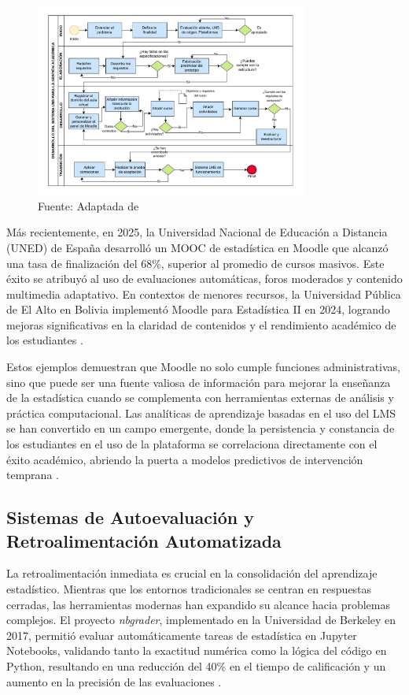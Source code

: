 \documentclass[letter,oneside,12pt,spanish]{report}
\begin{document}
\begin{figure}[ht]
    \centering
    \includegraphics[width=0.8\textwidth]{Figs/LMS.pdf}
    \label{fig:LMS}
    \\Fuente: Adaptada de \textcite{Pacheco2025}
\end{figure}

Más recientemente, en 2025, la Universidad Nacional de Educación a Distancia (UNED) de España desarrolló un MOOC de estadística en Moodle que alcanzó una tasa de finalización del 68\%, superior al promedio de cursos masivos. Este éxito se atribuyó al uso de evaluaciones automáticas, foros moderados y contenido multimedia adaptativo. En contextos de menores recursos, la Universidad Pública de El Alto en Bolivia implementó Moodle para Estadística II en 2024, logrando mejoras significativas en la claridad de contenidos y el rendimiento académico de los estudiantes \parencite{Ndibalema2025}.

Estos ejemplos demuestran que Moodle no solo cumple funciones administrativas, sino que puede ser una fuente valiosa de información para mejorar la enseñanza de la estadística cuando se complementa con herramientas externas de análisis y práctica computacional. Las analíticas de aprendizaje basadas en el uso del LMS se han convertido en un campo emergente, donde la persistencia y constancia de los estudiantes en el uso de la plataforma se correlaciona directamente con el éxito académico, abriendo la puerta a modelos predictivos de intervención temprana \parencite{Goh2025}.

\subsection{Sistemas de Autoevaluación y Retroalimentación Automatizada}
La retroalimentación inmediata es crucial en la consolidación del aprendizaje estadístico. Mientras que los entornos tradicionales se centran en respuestas cerradas, las herramientas modernas han expandido su alcance hacia problemas complejos. El proyecto \textit{nbgrader}, implementado en la Universidad de Berkeley en 2017, permitió evaluar automáticamente tareas de estadística en Jupyter Notebooks, validando tanto la exactitud numérica como la lógica del código en Python, resultando en una reducción del 40\% en el tiempo de calificación y un aumento en la precisión de las evaluaciones \parencite{Blank2017}.
\end{document}
